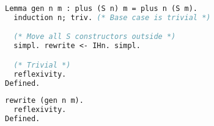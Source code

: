 \begin{lstlisting}[language=ML, xleftmargin=.2\textwidth, xrightmargin=.2\textwidth]
Lemma gen n m : plus (S n) m = plus n (S m).
  induction n; triv. (* Base case is trivial *)

  (* Move all S constructors outside *)
  simpl. rewrite <- IHn. simpl.

  (* Trivial *)
  reflexivity.
Defined.
\end{lstlisting}

\begin{lstlisting}[language=ML, xleftmargin=.2\textwidth, xrightmargin=.2\textwidth]
  rewrite (gen n m).
  reflexivity.
Defined.
\end{lstlisting}
